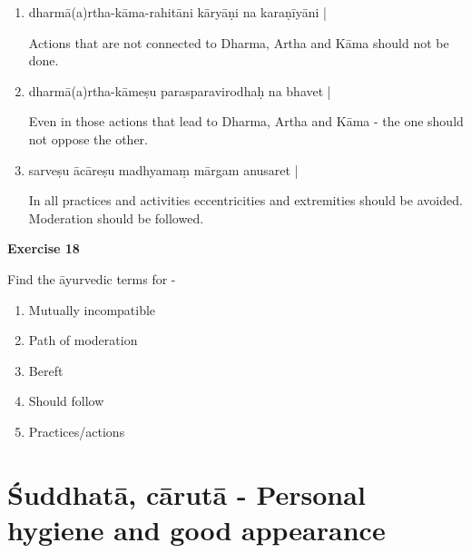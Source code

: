 \begin{enumerate}
\item {}

dharmā(a)rtha-kāma-rahitāni kāryāṇi na karaṇīyāni |

Actions that are not connected to Dharma, Artha and Kāma should not be done. 

\item {}

dharmā(a)rtha-kāmeṣu parasparavirodhaḥ na bhavet | 

Even in those actions that lead to Dharma, Artha and Kāma - the one should not oppose the other. 

\item {}

sarveṣu ācāreṣu madhyamaṃ mārgam anusaret | 

In all practices and activities eccentricities and extremities should be avoided. Moderation should be followed.
\end{enumerate}

\begin{center}
\textbf{\large Exercise 18}
\end{center}

Find the āyurvedic terms for -
\begin{enumerate}
\renewcommand{\theenumi}{\alph{enumi}}
\renewcommand{\labelenumi}{\theenumi.}
\item Mutually incompatible
\item Path of moderation 
\item Bereft
\item Should follow 
\item Practices/actions
\end{enumerate}

\chapter{Śuddhatā, cārutā - Personal hygiene and  good appearance}

